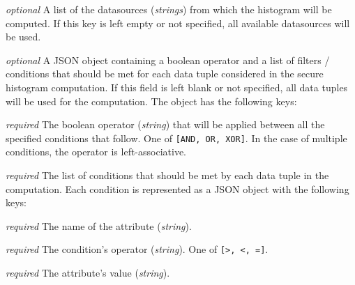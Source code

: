 \begin{description}[labelwidth=5em, leftmargin=\dimexpr\labelwidth+\labelsep\relax]
\begin{description}[labelwidth=6em, leftmargin=\dimexpr\labelwidth+\labelsep\relax]
    \item[\texttt{datasources}:] {\color{blue}\textit{optional}} A list of the datasources (\textit{strings}) from which the histogram will be computed.
    If this key is left empty or not specified, all available datasources will be used.

    \item[\texttt{filters}:] {\color{blue}\textit{optional}} A JSON object containing a boolean operator and a list of filters / conditions that should be met for each data tuple considered in the secure histogram computation.
    If this field is left blank or not specified, all data tuples will be used for the computation. The object has the following keys:

    \begin{description}[labelwidth=5em, leftmargin=\dimexpr\labelwidth+\labelsep\relax]
        \item[\texttt{operator}:] {\color{red}\textit{required}} The boolean operator (\textit{string}) that will be applied between all the specified conditions that follow. One of \texttt{[AND, OR, XOR]}.
        In the case of multiple conditions, the operator is left\hyp associative.

        \item[\texttt{conditions}:] {\color{red}\textit{required}} The list of conditions that should be met by each data tuple in the computation.
        Each condition is represented as a JSON object with the following keys:

        \begin{description}[labelwidth=5em, leftmargin=\dimexpr\labelwidth+\labelsep\relax]
            \item[\texttt{attribute}:] {\color{red}\textit{required}} The name of the attribute (\textit{string}).

            \item[\texttt{operator}:] {\color{red}\textit{required}} The condition's operator (\textit{string}). One of \texttt{[>, <, =]}.

            \item[\texttt{value}:] {\color{red}\textit{required}}  The attribute's value (\textit{string}).
        \end{description}

    \end{description}
\end{description}


\end{description}
